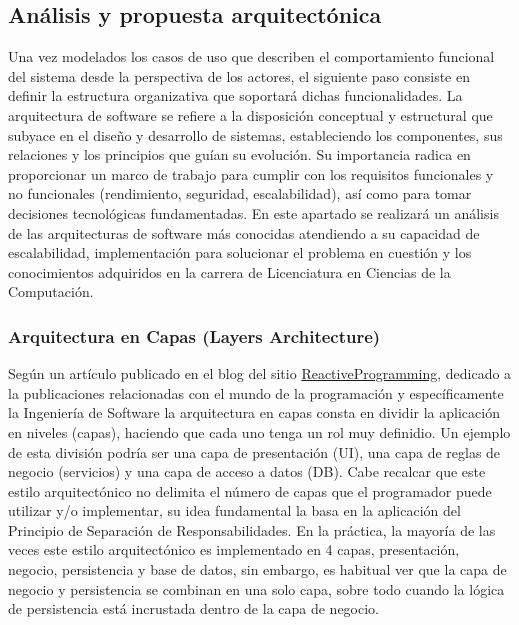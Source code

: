 \subsection{An\'alisis y propuesta arquitect\'onica}
Una vez modelados los casos de uso que describen el comportamiento funcional del 
sistema desde la perspectiva de los actores, el siguiente paso consiste en definir 
la estructura organizativa que soportará dichas funcionalidades. La arquitectura de 
software se refiere a la disposición conceptual y estructural que subyace en el diseño y 
desarrollo de sistemas, estableciendo los componentes, sus relaciones y los principios 
que guían su evolución. Su importancia radica en proporcionar un marco de trabajo para 
cumplir con los requisitos funcionales y no funcionales (rendimiento, seguridad, 
escalabilidad), así como para tomar decisiones tecnológicas fundamentadas\cite{architecture}. En este 
apartado se realizar\'a un an\'alisis de las arquitecturas de software m\'as conocidas
atendiendo a su capacidad de escalabilidad, implementaci\'on para solucionar el problema en cuesti\'on
y los conocimientos adquiridos en la carrera de Licenciatura en Ciencias de la Computaci\'on.

\subsubsection{Arquitectura en Capas (Layers Architecture)}
Según un art\'iculo publicado en el blog del sitio \href{https://reactiveprogramming.io/blog/es/estilos-arquitectonicos/capas}{ReactiveProgramming},
dedicado a la publicaciones relacionadas con el mundo de la programaci\'on y espec\'ificamente la Ingenier\'ia de Software
la arquitectura en capas consta en dividir la aplicaci\'on en niveles (capas), haciendo que cada uno
tenga un rol muy definidio\cite{capas}. Un ejemplo de esta divisi\'on podr\'ia ser una capa de presentaci\'on (UI),
una capa de reglas de negocio (servicios) y una capa de acceso a datos (DB). Cabe recalcar que este estilo arquitect\'onico
no delimita el n\'umero de capas que el programador puede utilizar y/o implementar, su idea fundamental la basa
en la aplicaci\'on del Principio de Separaci\'on de Responsabilidades\cite{separation}. En la práctica, la mayoría de las veces 
este estilo arquitectónico es implementado en 4 capas, presentación, negocio, persistencia 
y base de datos, sin embargo, es habitual ver que la capa de negocio y persistencia se 
combinan en una solo capa, sobre todo cuando la lógica de persistencia está incrustada 
dentro de la capa de negocio.

